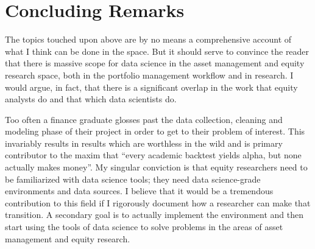 \documentclass[11pt,preprint, authoryear]{elsarticle}
\numberwithin{equation}{section}
\numberwithin{figure}{section}
\numberwithin{table}{section}
\begin{document}
\section{Concluding Remarks}\label{concluding-remarks}

The topics touched upon above are by no means a comprehensive account of
what I think can be done in the space. But it should serve to convince
the reader that there is massive scope for data science in the asset
management and equity research space, both in the portfolio management
workflow and in research. I would argue, in fact, that there is a
significant overlap in the work that equity analysts do and that which
data scientists do.

Too often a finance graduate glosses past the data collection, cleaning
and modeling phase of their project in order to get to their problem of
interest. This invariably results in results which are worthless in the
wild and is primary contributor to the maxim that ``every academic
backtest yields alpha, but none actually makes money''. My singular
conviction is that equity researchers need to be familiarized with data
science tools; they need data science-grade environments and data
sources. I believe that it would be a tremendous contribution to this
field if I rigorously document how a researcher can make that
transition. A secondary goal is to actually implement the environment
and then start using the tools of data science to solve problems in the
areas of asset management and equity research.

\newpage
\nocite{*}

\end{document}
